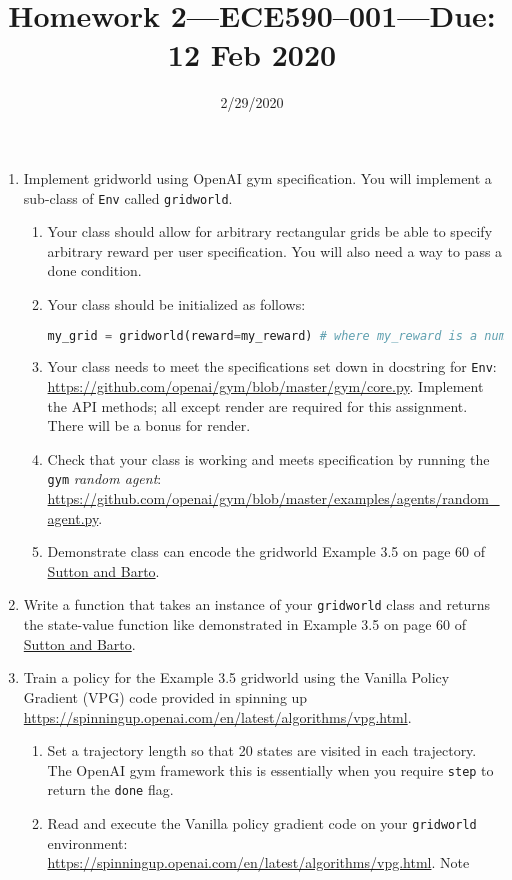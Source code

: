 \documentclass{article}
\title{Homework 2---ECE590--001---{\bf Due: 12 Feb 2020}}
\date{2/29/2020}
\begin{document}
\maketitle
\begin{enumerate}
\item Implement gridworld using OpenAI gym specification. You will implement a sub-class of {\tt Env} called {\tt gridworld}.
  \begin{enumerate}
  \item Your class should allow for arbitrary rectangular grids be able to specify arbitrary reward per user specification. You will also need a way to pass a done condition.
  \item Your class should be initialized as follows:
    \begin{lstlisting}[language=python]
      my_grid = gridworld(reward=my_reward) # where my_reward is a numpy.array of shape (n,m)
    \end{lstlisting}
  \item Your class needs to meet the specifications set down in docstring for {\tt Env}: \url{https://github.com/openai/gym/blob/master/gym/core.py}. Implement the API methods; all except
    render are required for this assignment. There will be a bonus for render.
  \item Check that your class is working and meets specification by running the {\tt gym} {\em random agent}: \url{https://github.com/openai/gym/blob/master/examples/agents/random_agent.py}.
  \item Demonstrate class can encode the gridworld Example 3.5 on page 60 of \href{http://incompleteideas.net/book/RLbook2018.pdf}{Sutton and Barto}.
  \end{enumerate}
\item Write a function that takes an instance of your {\tt gridworld} class and returns the state-value function like demonstrated in Example 3.5 on page 60 of
  \href{http://incompleteideas.net/book/RLbook2018.pdf}{Sutton and Barto}.
\item Train a policy for the Example 3.5 gridworld using the Vanilla Policy Gradient (VPG) code provided in spinning up \url{https://spinningup.openai.com/en/latest/algorithms/vpg.html}.
  \begin{enumerate}
  \item Set a trajectory length so that 20 states are visited in each
    trajectory. The OpenAI gym framework this is essentially when you require {\tt step} to return the {\tt done} flag.
  \item Read and execute the Vanilla policy gradient code on your {\tt gridworld} environment: \url{https://spinningup.openai.com/en/latest/algorithms/vpg.html}. Note

\end{enumerate}
\end{enumerate}
\end{document}
